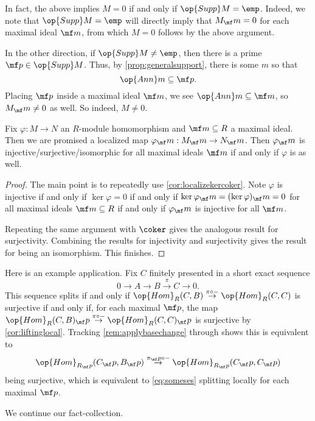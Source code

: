 \begin{remark}
	In fact, the above implies $M=0$ if and only if $\op{Supp}M=\emp$. Indeed, we note that $\op{Supp}M=\emp$ will directly imply that $M_\mf m=0$ for each maximal ideal $\mf m$, from which $M=0$ follows by the above argument.
	
	In the other direction, if $\op{Supp}M\ne\emp$, then there is a prime $\mf p\in\op{Supp}M$. Thus, by \autoref{prop:generalsupport}, there is some $m$ so that
	\[\op{Ann}m\subseteq\mf p.\]
	Placing $\mf p$ inside a maximal ideal $\mf m$, we see $\op{Ann}m\subseteq\mf m$, so $M_\mf m\ne0$ as well. So indeed, $M\ne0$.
\end{remark}
\begin{corollary} \label{cor:liftinglocal}
	Fix $\varphi:M\to N$ an $R$-module homomorphism and $\mf m\subseteq R$ a maximal ideal. Then we are promised a localized map $\varphi_\mf m:M_\mf m\to N_\mf m$. Then $\varphi_\mf m$ is injective/surjective/isomorphic for all maximal ideals $\mf m$ if and only if $\varphi$ is as well.
\end{corollary}
\begin{proof}
	The main point is to repeatedly use \autoref{cor:localizekercoker}. Note $\varphi$ is injective if and only if $\ker\varphi=0$ if and only if $\ker\varphi_\mf m=(\ker\varphi)_\mf m=0$ for all maximal ideals $\mf m\subseteq R$ if and only if $\varphi_\mf m$ is injective for all $\mf m$.
	
	Repeating the same argument with $\coker$ gives the analogous result for surjectivity. Combining the results for injectivity and surjectivity gives the result for being an isomorphism. This finishes.
\end{proof}
\begin{remark}[Nir]
	Here is an example application. Fix $C$ finitely presented in a short exact sequence
	\[0\to A\to B\stackrel\pi\to C\to 0.\tag{$*$}\label{eq:someses}\]
	This sequence splits if and only if $\op{Hom}_R(C,B)\stackrel{\pi\circ-}\to\op{Hom}_R(C,C)$ is surjective if and only if, for each maximal $\mf p$, the map $\op{Hom}_R(C,B)_\mf p\stackrel{\pi\circ-}\to\op{Hom}_R(C,C)_\mf p$ is surjective by \autoref{cor:liftinglocal}. Tracking \autoref{rem:applybasechange} through shows this is equivalent to
	\[\op{Hom}_{R_\mf p}(C_\mf p,B_\mf p)\stackrel{\pi_\mf p\circ-}\to\op{Hom}_{R_\mf p}(C_\mf p,C_\mf p)\]
	being surjective, which is equivalent to \autoref{eq:someses} splitting locally for each maximal $\mf p$.
\end{remark}
We continue our fact-collection.
